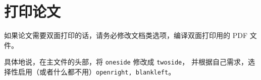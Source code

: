 \section{打印论文}

如果论文需要双面打印的话，请务必修改文档类选项，编译双面打印用的 PDF 文件。

具体地说，在主文件的头部，将 \texttt{oneside} 修改成 \texttt{twoside}，
并根据自己需求，选择性启用（或者什么都不用）\texttt{openright, blankleft}。
